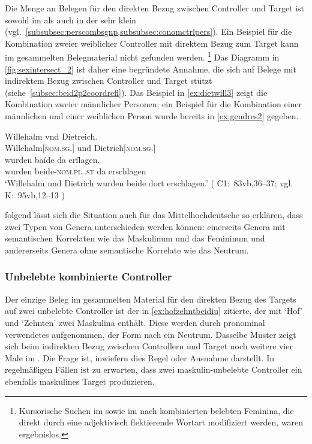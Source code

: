 Die Menge an Belegen für den direkten Bezug zwischen Controller und Target ist
sowohl im \CAO{} als auch in der \KC{} sehr klein
(vgl.~\cref{subsubsec:perscombsgnp,subsubsec:conomctrlpers}). Ein Beispiel für
die Kombination zweier weiblicher Controller mit direktem Bezug zum Target kann
im gesammelten Belegmaterial nicht gefunden werden.%
%
	\footnote{Kursorische Suchen im \CAO{} sowie im \REM{}
	nach kombinierten belebten Feminina, die direkt durch eine adjektivisch
	flektierende Wortart modifiziert werden, waren ergebnislos.}
%
Das Diagramm in \cref{fig:sexintersect_2} ist daher eine begründete Annahme, die
sich auf Belege mit indirektem Bezug zwischen Controller und Target stützt
(siehe~\cref{subsec:beid2p2coordrefl}). Das Beispiel in \cref{ex:dietwill3}
zeigt die Kombi\-nation zweier männlicher Personen; ein Beispiel für die
Kombination einer männlichen und einer weiblichen Person wurde bereits in
\cref{ex:gendres2} gegeben.

\begin{exe}
\ex\label{ex:dietwill3}
		\gll Willehalm vnd Dietreich. \\
			Willehalm[\textsc{nom.sg.\MascM}] und Dietrich[\textsc{nom.sg.\MascM}] \\
	\sn \gll wurden baíde da erſlagen. \\
			wurden beide-\textsc{nom.pl.\MascM.st} da erschlagen \\
		\trans `Willehalm und Dietrich wurden beide dort erschlagen.'
			(%
				C1:~83vb,36--37; vgl.
				K:~95vb,12--13%
			)
\end{exe}

\textcites[576]{wechsler2009}[182]{wechslerzlatic2003} folgend lässt sich die
Situation auch für das Mittelhochdeutsche so erklären, dass zwei Typen von
Genera unterschieden werden können: einerseits Genera mit semantischen
Korrelaten wie das Maskulinum und das Femininum und andererseits Genera ohne
semantische Korrelate wie das Neutrum.

\subsubsection{Unbelebte kombinierte Controller}
\label{subsubsec:x+x_dir_inan}

Der einzige Beleg im gesammelten Material für den direkten Bezug des Targets
auf zwei unbelebte Controller ist der in \cref{ex:hofzehntbeidiu} zitierte, der
mit  `Hof' und  `Zehnten' zwei Maskulina
enthält. Diese werden durch pronominal verwendetes  aufgenommen,
der Form nach ein Neutrum. Dasselbe Muster zeigt sich beim indirekten Bezug
zwischen Controllern und Target noch weitere vier Male im \CAO{}. Die
Frage ist, inwiefern dies Regel oder Ausnahme darstellt. In regelmäßigen Fällen
ist zu erwarten, dass zwei maskulin-unbelebte Controller ein ebenfalls
maskulines Target produzieren.

